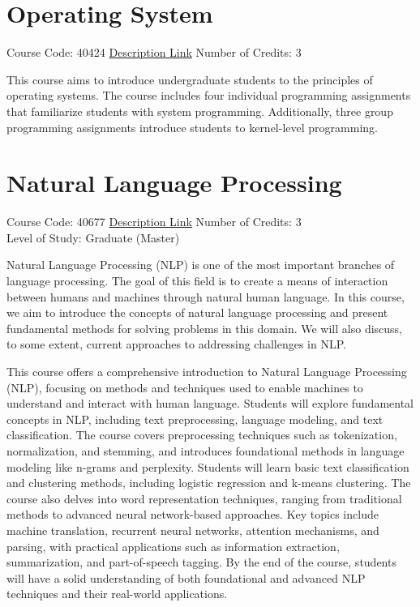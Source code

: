 \documentclass[
fontsize=11pt,
paper=a4,
parskip=half,
enlargefirstpage=off,    %
fromalign=right,        %
fromphone=on,           %
fromemail=on,
fromrule=off,           %
addrfield=off,          %
backaddress=on,         %
subject=beforeopening,  %
locfield=narrow,        %
foldmarks=off,          %
open=any
]{scrartcl}
\begin{document}
\section{Operating System}
Course Code: 40424 \qquad \quad \href{https://docs.ce.sharif.edu/course/40424}{Description Link}
\qquad \quad Number of Credits: 3

This course aims to introduce undergraduate students to the principles of operating systems. The course includes four individual programming assignments that familiarize students with system programming. Additionally, three group programming assignments introduce students to kernel-level programming.

\section{Natural Language Processing}
Course Code: 40677 \qquad \quad \href{https://docs.ce.sharif.edu/course/40677}{Description Link}
\qquad \quad Number of Credits: 3 
\\Level of Study: Graduate (Master)

Natural Language Processing (NLP) is one of the most important branches of language processing. The goal of this field is to create a means of interaction between humans and machines through natural human language. In this course, we aim to introduce the concepts of natural language processing and present fundamental methods for solving problems in this domain. We will also discuss, to some extent, current approaches to addressing challenges in NLP.

This course offers a comprehensive introduction to Natural Language Processing (NLP), focusing on methods and techniques used to enable machines to understand and interact with human language. Students will explore fundamental concepts in NLP, including text preprocessing, language modeling, and text classification. The course covers preprocessing techniques such as tokenization, normalization, and stemming, and introduces foundational methods in language modeling like n-grams and perplexity. Students will learn basic text classification and clustering methods, including logistic regression and k-means clustering. The course also delves into word representation techniques, ranging from traditional methods to advanced neural network-based approaches. Key topics include machine translation, recurrent neural networks, attention mechanisms, and parsing, with practical applications such as information extraction, summarization, and part-of-speech tagging. By the end of the course, students will have a solid understanding of both foundational and advanced NLP techniques and their real-world applications.
\end{document}
